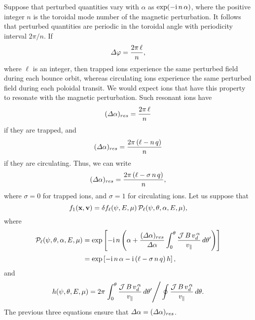 \documentclass[12pt,prb,aps,notitlepage]{revtex4-1}
\begin{document}
 Suppose that perturbed quantities vary with $\alpha$ as $\exp(-{\rm i}\,n\,\alpha)$, where the positive integer $n$ is the toroidal
 mode number of the magnetic perturbation. It follows that perturbed quantities are periodic in the toroidal angle with periodicity interval $2\pi/n$. If
 \begin{equation}
 {\mit\Delta}\varphi = \frac{2\pi\,\ell}{n},
 \end{equation}
 where $\ell$ is an integer, then trapped ions experience the same perturbed field during each  bounce orbit, whereas circulating
 ions experience the same perturbed field during each poloidal transit.  We would expect ions that have this property to resonate with the
 magnetic perturbation. Such resonant ions have
 \begin{equation}
 ({\mit\Delta}\alpha)_{res} = \frac{2\pi\,\ell}{n}
 \end{equation}
 if they are trapped, and 
 \begin{equation}
 ({\mit\Delta}\alpha)_{res} = \frac{2\pi\,(\ell-n\,q)}{n}
 \end{equation}
 if they are circulating.
Thus, we can write
  \begin{equation}
 ({\mit\Delta}\alpha)_{res} = \frac{2\pi\,(\ell-\sigma\,n\,q)}{n},
 \end{equation}
 where $\sigma=0$ for trapped ions, and $\sigma=1$ for circulating ions. Let us suppose that
 \begin{equation}\label{e83}
 f_1({\bf x},{\bf v})= \delta f_{\ell}(\psi,E,\mu)\,{\cal P}_{\ell}(\psi,\theta,\alpha,E,\mu),
 \end{equation}
 where
 \begin{align}
 {\cal P}_\ell(\psi,\theta,\alpha,E,\mu)& = \exp\left[-{\rm i}\,n\left(\alpha + \frac{({\mit\Delta}\alpha)_{res}}{{\mit\Delta}\alpha}\int_0^\theta\frac{{\cal J}\,B\,v_d^{\,\alpha}}{v_\parallel}\, d\theta'\right)\right]\nonumber\\[0.5ex]
 & = \exp\left[-{\rm i}\,n\,\alpha -{\rm i}\,(\ell - \sigma\,n\,q)\,h\right],
 \end{align}
 and
 \begin{equation}\label{e85}
 h(\psi,\theta,E,\mu)=2\pi \left.\int_0^\theta\frac{{\cal J}\,B\,v_d^{\,\alpha}}{v_\parallel}\, d\theta' \right/
 \oint\frac{{\cal J}\,B\,v_d^{\,\alpha}}{v_\parallel}\,d\theta.
 \end{equation}
 The previous three equations ensure that ${\mit\Delta}\alpha= ({\mit\Delta}\alpha)_{res}$. 
 
\end{document}
